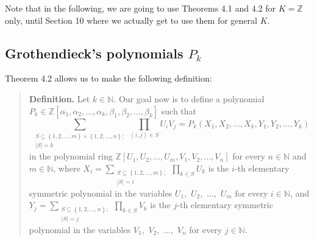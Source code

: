\documentclass[numbers=enddot,12pt,final,onecolumn,notitlepage]{scrartcl}%
\begin{document}
Note that in the following, we are going to use Theorems 4.1 and 4.2 for
$K=\mathbb{Z}$ only, until Section 10 where we actually get to use them for
general $K$.

\subsection{Grothendieck's polynomials $P_{k}$}

Theorem 4.2 allows us to make the following definition:

\begin{quote}
\textbf{Definition.} Let $k\in\mathbb{N}$. Our goal now is to define a
polynomial $P_{k}\in\mathbb{Z}\left[  \alpha_{1},\alpha_{2},...,\alpha
_{k},\beta_{1},\beta_{2},...,\beta_{k}\right]  $ such that%
\begin{equation}
\sum_{\substack{S\subseteq\left\{  1,2,...,m\right\}  \times\left\{
1,2,...,n\right\}  ;\\\left\vert S\right\vert =k}}\prod_{\left(  i,j\right)
\in S}U_{i}V_{j}=P_{k}\left(  X_{1},X_{2},...,X_{k},Y_{1},Y_{2},...,Y_{k}%
\right)  \label{Pk1}%
\end{equation}
in the polynomial ring $\mathbb{Z}\left[  U_{1},U_{2},...,U_{m},V_{1}%
,V_{2},...,V_{n}\right]  $ for every $n\in\mathbb{N}$ and $m\in\mathbb{N}$,
where $X_{i}=\sum\limits_{\substack{S\subseteq\left\{  1,2,...,m\right\}
;\\\left\vert S\right\vert =i}}\prod\limits_{k\in S}U_{k}$ is the $i$-th
elementary symmetric polynomial in the variables $U_{1},$ $U_{2},$ $...,$
$U_{m}$ for every $i\in\mathbb{N}$, and $Y_{j}=\sum
\limits_{\substack{S\subseteq\left\{  1,2,...,n\right\}  ;\\\left\vert
S\right\vert =j}}\prod\limits_{k\in S}V_{k}$ is the $j$-th elementary
symmetric polynomial in the variables $V_{1},$ $V_{2},$ $...,$ $V_{n}$ for
every $j\in\mathbb{N}$.


\end{quote}
\end{document}
